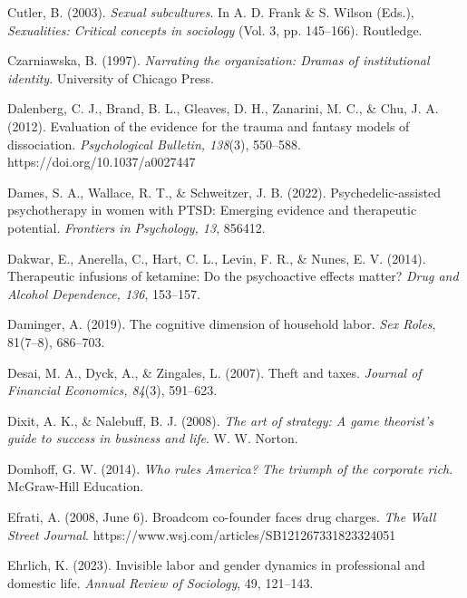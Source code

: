 \begin{thebibliography}{}
    Cutler, B. (2003). \textit{Sexual subcultures}. In A. D. Frank \& S. Wilson (Eds.), \textit{Sexualities: Critical concepts in sociology} (Vol. 3, pp. 145--166). Routledge.
    
    Czarniawska, B. (1997). \textit{Narrating the organization: Dramas of institutional identity}. University of Chicago Press.


    Dalenberg, C. J., Brand, B. L., Gleaves, D. H., Zanarini, M. C., \& Chu, J. A. (2012). Evaluation of the evidence for the trauma and fantasy models of dissociation. \textit{Psychological Bulletin, 138}(3), 550–588. https://doi.org/10.1037/a0027447

    Dames, S. A., Wallace, R. T., \& Schweitzer, J. B. (2022). Psychedelic-assisted psychotherapy in women with PTSD: Emerging evidence and therapeutic potential. \textit{Frontiers in Psychology, 13}, 856412.

    Dakwar, E., Anerella, C., Hart, C. L., Levin, F. R., \& Nunes, E. V. (2014). Therapeutic infusions of ketamine: Do the psychoactive effects matter? \textit{Drug and Alcohol Dependence, 136}, 153–157.

    Daminger, A. (2019). The cognitive dimension of household labor. \textit{Sex Roles}, 81(7–8), 686–703.

    Desai, M. A., Dyck, A., \& Zingales, L. (2007). Theft and taxes. \textit{Journal of Financial Economics, 84}(3), 591–623.

    Dixit, A. K., \& Nalebuff, B. J. (2008). \textit{The art of strategy: A game theorist’s guide to success in business and life}. W. W. Norton.

    Domhoff, G. W. (2014). \textit{Who rules America? The triumph of the corporate rich}. McGraw-Hill Education.


    Efrati, A. (2008, June 6). Broadcom co-founder faces drug charges. \textit{The Wall Street Journal}. https://www.wsj.com/articles/SB121267331823324051
    
    Ehrlich, K. (2023). Invisible labor and gender dynamics in professional and domestic life. \textit{Annual Review of Sociology}, 49, 121–143.


\end{thebibliography}
